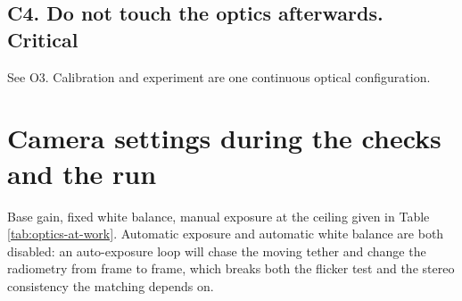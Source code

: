 \subsection*{C4. Do not touch the optics afterwards. \textnormal{Critical}}

See O3. Calibration and experiment are one continuous optical configuration.

\section{Camera settings during the checks and the run}

Base gain, fixed white balance, manual exposure at the ceiling given in Table
\ref{tab:optics-at-work}. Automatic exposure and automatic white balance are
both disabled: an auto-exposure loop will chase the moving tether and change
the radiometry from frame to frame, which breaks both the flicker test and the
stereo consistency the matching depends on.
